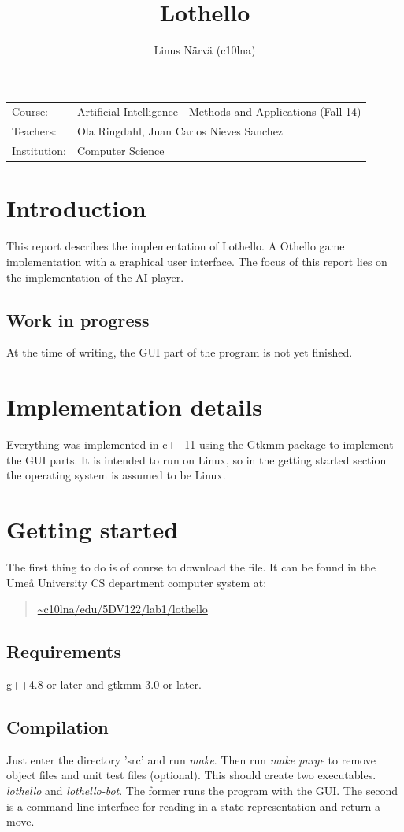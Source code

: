 \documentclass[a4paper,11pt]{article}
\title{Lothello}
\author{Linus Närvä (c10lna)}
\begin{document}
\maketitle

\begin{tabular}{l l}
Course: & Artificial Intelligence - Methods and Applications (Fall 14) \\
Teachers: & Ola Ringdahl, Juan Carlos Nieves Sanchez \\
Institution: & Computer Science \\
\end{tabular}

\section{Introduction}
This report describes the implementation of Lothello. A Othello game implementation with a graphical user interface. The focus of this report lies on the implementation of the AI player.

\subsection{Work in progress}
At the time of writing, the GUI part of the program is not yet finished.

\section{Implementation details}
Everything was implemented in c++11 using the Gtkmm package to implement the GUI parts. It is intended to run on Linux, so in the getting started section the operating system is assumed to be Linux.

\section{Getting started}
The first thing to do is of course to download the file. It can be found in the Umeå University CS department computer system at:
\begin{quotation}
\url{~c10lna/edu/5DV122/lab1/lothello}
\end{quotation}

\subsection{Requirements}
g++4.8 or later and gtkmm 3.0 or later.

\subsection{Compilation}
Just enter the directory 'src' and run \textit{make}. Then run \textit{make purge} to remove object files and unit test files (optional). This should create two executables. \textit{lothello} and \textit{lothello-bot}. The former runs the program with the GUI. The second is a command line interface for reading in a state representation and return a move.
\end{document}

